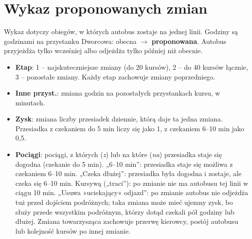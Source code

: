 \documentclass[10pt,a4paper]{article}
\begin{document}
\section{Wykaz proponowanych zmian}
Wykaz dotyczy obiegów, w których autobus zostaje na jednej linii. Godziny są godzinami na przystanku Dworcowa: obecna $\to$ \textbf{proponowana}. Autobus przyjeżdża tylko wcześniej albo odjeżdża tylko później niż obecnie.
\begin{itemize}[itemsep=1pt]
\item \textbf{Etap}: 1 -- najskuteczniejsze zmiany (do 20 kursów), 2 -- do 40 kursów łącznie, 3 -- pozostałe zmiany. Każdy etap zachowuje zmiany poprzedniego.
\item \textbf{Inne przyst.}: zmiana godzin na pozostałych przystankach kursu, w minutach.
\item \textbf{Zysk}: zmiana liczby przesiadek dziennie, którą daje ta jedna zmiana. Przesiadka z czekaniem do 5 min liczy się jako 1, z czekaniem 6--10 min jako 0,5.
\item \textbf{Pociągi}: pociągi, z których (\emph{z}) lub na które (\emph{na}) przesiadka staje się dogodna (czekanie do 5 min). „6--10 min”: przesiadka staje się możliwa z czekaniem 6--10 min. „Czeka dłużej”: przesiadka była dogodna i zostaje, ale czeka się 6--10 min. Kursywą („traci”): po zmianie nie ma autobusu tej linii w ciągu 10 min. „Usuwa »uciekający« odjazd”: po zmianie autobus nie odjeżdża tuż przed dojściem podróżnych; taka zmiana może mieć ujemny zysk, bo służy przede wszystkim podróżnym, którzy dotąd czekali pół godziny lub dłużej. Zmiana towarzysząca zachowuje przerwę kierowcy, postój autobusu lub kolejność kursów po innej zmianie.
\end{itemize}
{\footnotesize\setlength{\tabcolsep}{3pt}\renewcommand{\arraystretch}{1.15}

}
\end{document}
